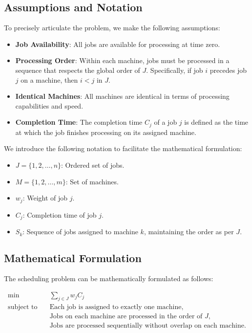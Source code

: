 \subsection*{Assumptions and Notation}

To precisely articulate the problem, we make the following assumptions:

\begin{itemize}
    \item \textbf{Job Availability}: All jobs are available for processing at time zero.

    \item \textbf{Processing Order}: Within each machine, jobs must be processed in a sequence that respects the global order of $J$. Specifically, if job $i$ precedes job $j$ on a machine, then $i < j$ in $J$.

    \item \textbf{Identical Machines}: All machines are identical in terms of processing capabilities and speed.

    \item \textbf{Completion Time}: The completion time $C_j$ of a job $j$ is defined as the time at which the job finishes processing on its assigned machine.
\end{itemize}

We introduce the following notation to facilitate the mathematical formulation:

\begin{itemize}
    \item $J = \{1, 2, \dots, n\}$: Ordered set of jobs.
    \item $M = \{1, 2, \dots, m\}$: Set of machines.
    \item $w_j$: Weight of job $j$.
    \item $C_j$: Completion time of job $j$.
    \item $S_k$: Sequence of jobs assigned to machine $k$, maintaining the order as per $J$.
\end{itemize}

\subsection*{Mathematical Formulation}

The scheduling problem can be mathematically formulated as follows:

\begin{align*}
    \min \quad & \sum_{j \in J} w_j C_j \\
    \text{subject to} \quad & \text{Each job is assigned to exactly one machine}, \\
    & \text{Jobs on each machine are processed in the order of } J, \\
    & \text{Jobs are processed sequentially without overlap on each machine}.
\end{align*}

